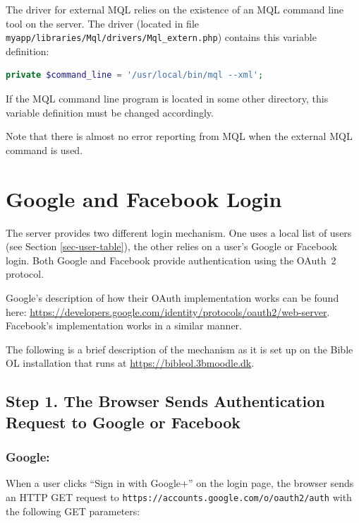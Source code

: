 \documentclass[11pt,oneside,a4paper]{memoir}
\begin{document}
The driver for external MQL relies on the existence of an MQL command line tool on the server. The
driver (located in file \texttt{myapp/libraries/Mql/drivers/Mql\_extern.php}) contains this variable
definition:

\begin{lstlisting}[language=PHP]
private $command_line = '/usr/local/bin/mql --xml';
\end{lstlisting}

If the MQL command line program is located in some other directory, this variable definition must be
changed accordingly.

Note that there is almost no error reporting from MQL when the external MQL command is used.


\section{Google and Facebook Login}\label{sec-oauth-login}

The server provides two different login mechanism. One uses a local list of users
(see Section \ref{sec-user-table}), the other relies on a user's Google or Facebook login. Both
Google and Facebook provide authentication using the OAuth~2 protocol.

Google's description of how their OAuth implementation works can be found here:
\url{https://developers.google.com/identity/protocols/oauth2/web-server}. Facebook's implementation works
in a similar manner.

The following is a brief description of the mechanism as it is set up on the Bible OL installation
that runs at \url{https://bibleol.3bmoodle.dk}.

\subsection*{Step 1. The Browser Sends Authentication Request to Google or Facebook}

\subsubsection*{Google:}

When a user clicks ``Sign in with Google+'' on the login page, the browser sends an HTTP GET request
to \texttt{https://accounts.google.com/o/oauth2/auth} with the following GET parameters:
\end{document}
